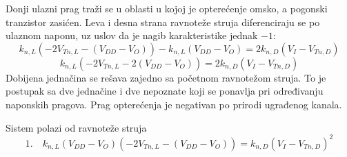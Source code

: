Donji ulazni prag traži se u oblasti u kojoj je opterećenje omsko, a pogonski tranzistor zasićen. Leva i desna strana ravnoteže struja diferenciraju se po ulaznom naponu, uz uslov da je nagib karakteristike jednak $-1$:
\[k_{n,L}\left(-2V_{Tn,L}-(V_{DD}-V_O)\right)-k_{n,L}(V_{DD}-V_O)=2k_{n,D}(V_I-V_{Tn,D})\]
\[k_{n,L}\left(-2V_{Tn,L}-2(V_{DD}-V_O)\right)=2k_{n,D}(V_I-V_{Tn,D})\]
Dobijena jednačina se rešava zajedno sa početnom ravnotežom struja. To je postupak sa dve jednačine i dve nepoznate koji se ponavlja pri određivanju naponskih pragova. Prag opterećenja je negativan po prirodi ugrađenog kanala.

Sistem polazi od ravnoteže struja
\[1.\quad k_{n,L}(V_{DD}-V_O)\left(-2V_{Tn,L}-(V_{DD}-V_O)\right)=k_{n,D}(V_I-V_{Tn,D})^2\]
